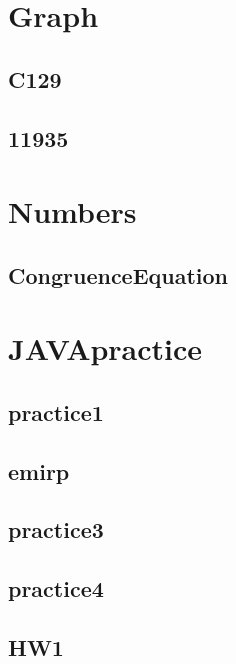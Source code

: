 

\section{Graph}
    \subsection{C129}
        
        
    \subsection{11935}
        
        

\section{Numbers}
    \subsection{CongruenceEquation}
        

\section{JAVApractice}
    \subsection{practice1}
        
    \subsection{emirp}
        
    \subsection{practice3}
        
    \subsection{practice4}
        
    \subsection{HW1}
        
